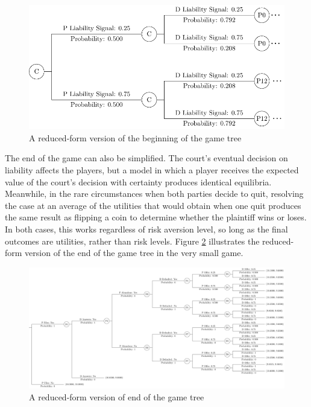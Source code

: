 \documentclass{article}
\begin{document}
\begin{figure}[h!]
\centering
\includegraphics[scale=0.25, trim={0in 0in 0in 0in}, clip]{../Figures/game tree 2x2x2 beginning simplified.pdf}
\caption{A reduced-form version of the beginning of the game tree}
\label{fig:gametree2x2x2beginning_reduced}
\end{figure}

The end of the game can also be simplified. The court's eventual decision on liability affects the players, but a model in which a player receives the expected value of the court's decision with certainty produces identical equilibria. Meanwhile, in the rare circumstances when both parties decide to quit, resolving the case at an average of the utilities that would obtain when one quit produces the same result as flipping a coin to determine whether the plaintiff wins or loses. In both cases, this works regardless of risk aversion level, so long as the final outcomes are utilities, rather than risk levels. Figure \ref{fig:gametree2x2x2end_reduced} illustrates the reduced-form version of the end of the game tree in the very small game.

\begin{figure}[h!]
\centering
\includegraphics[scale=0.25, trim={0in 0in 0in 0in}, clip]{../Figures/game tree 2x2x2 end simplified.pdf}
\caption{A reduced-form version of end of the game tree}
\label{fig:gametree2x2x2end_reduced}
\end{figure}
\end{document}
